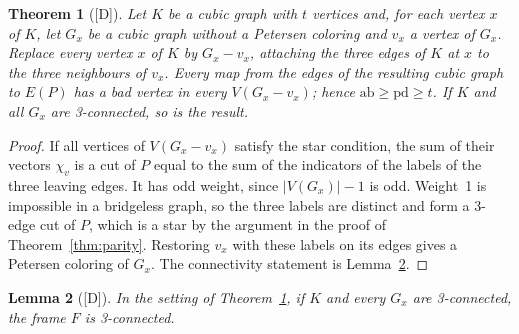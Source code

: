 \documentclass[11pt]{article}
\newtheorem{theorem}{Theorem}[section]
\newtheorem{lemma}[theorem]{Lemma}
\theoremstyle{definition}
\theoremstyle{remark}
\newcommand{\PG}{P}
\newcommand{\pd}{\mathrm{pd}}
\newcommand{\ab}{\mathrm{ab}}
\newcommand{\dd}{\textup{[D]}}
\begin{document}
\begin{theorem}[\dd]\label{thm:frames}
Let $K$ be a cubic graph with $t$ vertices and, for each vertex $x$ of $K$, let $G_x$ be a cubic
graph without a Petersen coloring and $v_x$ a vertex of $G_x$. Replace every vertex $x$ of $K$ by
$G_x - v_x$, attaching the three edges of $K$ at $x$ to the three neighbours of $v_x$. Every map
from the edges of the resulting cubic graph to $E(\PG)$ has a bad vertex in every
$V(G_x - v_x)$; hence $\ab \ge \pd \ge t$. If $K$ and all $G_x$ are 3-connected, so is the result.
\end{theorem}

\begin{proof}
If all vertices of $V(G_x - v_x)$ satisfy the star condition, the sum of their vectors $\chi_v$ is
a cut of $\PG$ equal to the sum of the indicators of the labels of the three leaving edges. It has
odd weight, since $|V(G_x)| - 1$ is odd. Weight~1 is impossible in a bridgeless graph, so the
three labels are distinct and form a 3-edge cut of $\PG$, which is a star by the argument in the
proof of Theorem~\ref{thm:parity}. Restoring $v_x$ with these labels on its edges gives a Petersen
coloring of $G_x$. The connectivity statement is Lemma~\ref{lem:frame3}.
\end{proof}

\begin{lemma}[\dd]\label{lem:frame3}
In the setting of Theorem~\ref{thm:frames}, if $K$ and every $G_x$ are 3-connected, the frame $F$ is
3-connected.
\end{lemma}
\end{document}
